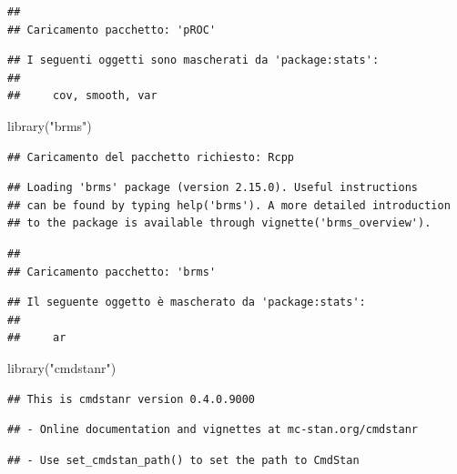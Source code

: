 \documentclass[
]{article}
\newenvironment{Shaded}{\begin{snugshade}}{\end{snugshade}}
\newcommand{\FunctionTok}[1]{\textcolor[rgb]{0.00,0.00,0.00}{#1}}
\newcommand{\NormalTok}[1]{#1}
\newcommand{\StringTok}[1]{\textcolor[rgb]{0.31,0.60,0.02}{#1}}
\begin{document}
\begin{verbatim}
## 
## Caricamento pacchetto: 'pROC'
\end{verbatim}

\begin{verbatim}
## I seguenti oggetti sono mascherati da 'package:stats':
## 
##     cov, smooth, var
\end{verbatim}

\begin{Shaded}
\begin{Highlighting}[]
\FunctionTok{library}\NormalTok{(}\StringTok{"brms"}\NormalTok{)}
\end{Highlighting}
\end{Shaded}

\begin{verbatim}
## Caricamento del pacchetto richiesto: Rcpp
\end{verbatim}

\begin{verbatim}
## Loading 'brms' package (version 2.15.0). Useful instructions
## can be found by typing help('brms'). A more detailed introduction
## to the package is available through vignette('brms_overview').
\end{verbatim}

\begin{verbatim}
## 
## Caricamento pacchetto: 'brms'
\end{verbatim}

\begin{verbatim}
## Il seguente oggetto è mascherato da 'package:stats':
## 
##     ar
\end{verbatim}

\begin{Shaded}
\begin{Highlighting}[]
\FunctionTok{library}\NormalTok{(}\StringTok{"cmdstanr"}\NormalTok{)}
\end{Highlighting}
\end{Shaded}

\begin{verbatim}
## This is cmdstanr version 0.4.0.9000
\end{verbatim}

\begin{verbatim}
## - Online documentation and vignettes at mc-stan.org/cmdstanr
\end{verbatim}

\begin{verbatim}
## - Use set_cmdstan_path() to set the path to CmdStan
\end{verbatim}
\end{document}
